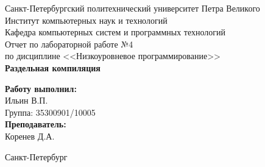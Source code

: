 

    \begin{titlepage}

        \begin{center}

            \large Санкт-Петербургский политехнический университет Петра Великого\\
            \large Институт компьютерных наук и технологий \\
            \large Кафедра компьютерных систем и программных технологий\\[6cm]

            \huge Отчет по лабораторной работе №4\\[0.5cm]
            \large по дисциплине <<Низкоуровневое программирование>>\\[0.1cm]
            \large\textbf{Раздельная компиляция}\\[5cm]

        \end{center}


        \begin{flushright}
            \begin{minipage}{0.25\textwidth}
                \begin{flushleft}

                    \large\textbf{Работу выполнил:}\\
                    \large Ильин В.П.\\
                    \large {Группа:} 35300901/10005\\

                    \large \textbf{Преподаватель:}\\
                    \large Коренев Д.А.

                \end{flushleft}
            \end{minipage}
        \end{flushright}

        \vfill

        \begin{center}
            \large Санкт-Петербург\\
            \large \the\year
        \end{center}

    \end{titlepage}
    \vfill
    \newpage
    \renewcommand\contentsname{\centerline{Содержание}}
    \tableofcontents
    \newpage
    \pagestyle{fancy}
    \setlength{\headheight}{14.5pt}
    \renewcommand{\sectionmark}[1]{\markright{#1}}

